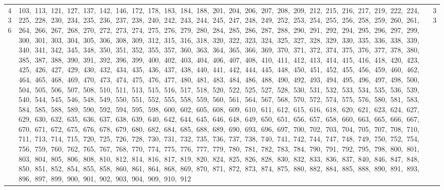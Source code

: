 \begin{longtable}{c|p{}|r}
436 & 103,\ 113,\ 121,\ 127,\ 137,\ 142,\ 146,\ 172,\ 178,\ 183,\ 184,\ 188,\ 201,\ 204,\ 206,\ 207,\ 208,\ 209,\ 212,\ 215,\ 216,\ 217,\ 219,\ 222,\ 224,\ 225,\ 228,\ 230,\ 234,\ 235,\ 236,\ 237,\ 238,\ 240,\ 242,\ 243,\ 244,\ 245,\ 247,\ 248,\ 249,\ 252,\ 253,\ 254,\ 255,\ 256,\ 258,\ 259,\ 260,\ 261,\ 264,\ 266,\ 267,\ 268,\ 270,\ 272,\ 273,\ 274,\ 275,\ 276,\ 279,\ 280,\ 284,\ 285,\ 286,\ 287,\ 288,\ 290,\ 291,\ 292,\ 294,\ 295,\ 296,\ 297,\ 299,\ 300,\ 301,\ 303,\ 304,\ 305,\ 306,\ 308,\ 309,\ 312,\ 315,\ 316,\ 318,\ 320,\ 322,\ 323,\ 324,\ 325,\ 327,\ 328,\ 329,\ 330,\ 335,\ 336,\ 338,\ 339,\ 340,\ 341,\ 342,\ 345,\ 348,\ 350,\ 351,\ 352,\ 355,\ 357,\ 360,\ 363,\ 364,\ 365,\ 366,\ 369,\ 370,\ 371,\ 372,\ 374,\ 375,\ 376,\ 377,\ 378,\ 380,\ 385,\ 387,\ 388,\ 390,\ 391,\ 392,\ 396,\ 399,\ 400,\ 402,\ 403,\ 404,\ 406,\ 407,\ 408,\ 410,\ 411,\ 412,\ 413,\ 414,\ 415,\ 416,\ 418,\ 420,\ 423,\ 425,\ 426,\ 427,\ 429,\ 430,\ 432,\ 434,\ 435,\ 436,\ 437,\ 438,\ 440,\ 441,\ 442,\ 444,\ 445,\ 448,\ 450,\ 451,\ 452,\ 455,\ 456,\ 459,\ 460,\ 462,\ 464,\ 465,\ 468,\ 469,\ 470,\ 473,\ 474,\ 475,\ 476,\ 477,\ 480,\ 481,\ 483,\ 484,\ 486,\ 488,\ 490,\ 492,\ 493,\ 494,\ 495,\ 496,\ 497,\ 498,\ 500,\ 504,\ 505,\ 506,\ 507,\ 508,\ 510,\ 511,\ 513,\ 515,\ 516,\ 517,\ 518,\ 520,\ 522,\ 525,\ 527,\ 528,\ 530,\ 531,\ 532,\ 533,\ 534,\ 535,\ 536,\ 539,\ 540,\ 544,\ 545,\ 546,\ 548,\ 549,\ 550,\ 551,\ 552,\ 555,\ 558,\ 559,\ 560,\ 561,\ 564,\ 567,\ 568,\ 570,\ 572,\ 574,\ 575,\ 576,\ 580,\ 581,\ 583,\ 584,\ 585,\ 588,\ 589,\ 590,\ 592,\ 594,\ 595,\ 598,\ 600,\ 602,\ 605,\ 608,\ 609,\ 610,\ 611,\ 612,\ 615,\ 616,\ 618,\ 620,\ 621,\ 623,\ 624,\ 627,\ 629,\ 630,\ 632,\ 635,\ 636,\ 637,\ 638,\ 639,\ 640,\ 642,\ 644,\ 645,\ 646,\ 648,\ 649,\ 650,\ 651,\ 656,\ 657,\ 658,\ 660,\ 663,\ 665,\ 666,\ 667,\ 670,\ 671,\ 672,\ 675,\ 676,\ 678,\ 679,\ 680,\ 682,\ 684,\ 685,\ 688,\ 689,\ 690,\ 693,\ 696,\ 697,\ 700,\ 702,\ 703,\ 704,\ 705,\ 707,\ 708,\ 710,\ 711,\ 713,\ 714,\ 715,\ 720,\ 725,\ 726,\ 728,\ 730,\ 731,\ 732,\ 735,\ 736,\ 737,\ 738,\ 740,\ 741,\ 742,\ 744,\ 747,\ 748,\ 749,\ 750,\ 752,\ 754,\ 756,\ 759,\ 760,\ 762,\ 765,\ 767,\ 768,\ 770,\ 774,\ 775,\ 776,\ 777,\ 779,\ 780,\ 781,\ 782,\ 783,\ 784,\ 790,\ 791,\ 792,\ 795,\ 798,\ 800,\ 801,\ 803,\ 804,\ 805,\ 806,\ 808,\ 810,\ 812,\ 814,\ 816,\ 817,\ 819,\ 820,\ 824,\ 825,\ 826,\ 828,\ 830,\ 832,\ 833,\ 836,\ 837,\ 840,\ 846,\ 847,\ 848,\ 850,\ 851,\ 852,\ 854,\ 855,\ 858,\ 860,\ 861,\ 864,\ 868,\ 869,\ 870,\ 871,\ 872,\ 873,\ 874,\ 875,\ 880,\ 882,\ 884,\ 885,\ 888,\ 890,\ 891,\ 893,\ 896,\ 897,\ 899,\ 900,\ 901,\ 902,\ 903,\ 904,\ 909,\ 910,\ 912 & 33 \\

\end{longtable}
